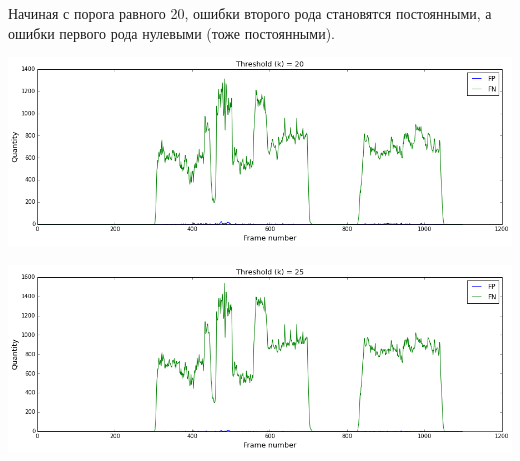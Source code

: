 \documentclass[12pt, a4paper]{article}
\begin{document}
			Начиная с порога равного 20, ошибки второго рода становятся постоянными, а ошибки первого рода нулевыми (тоже постоянными).
			\begin{center}
				\includegraphics[width=17cm]{2par_k_20.png}
			\end{center}
			\begin{center}
				\includegraphics[width=17cm]{2par_k_25.png}
			\end{center}
\end{document}

